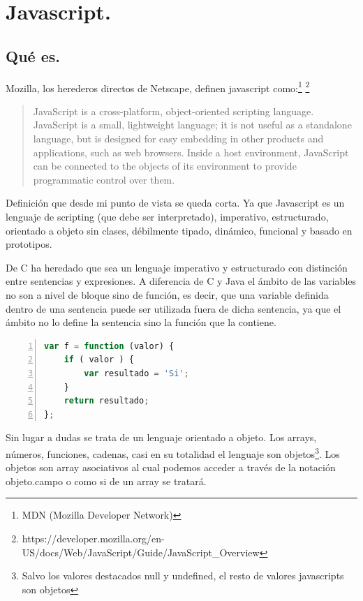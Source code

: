 \section{Javascript.}

\subsection{Qué es.}

Mozilla, los herederos directos de Netscape, definen javascript como:\footnote{MDN (Mozilla Developer Network)} \footnote{https://developer.mozilla.org/en-US/docs/Web/JavaScript/Guide/JavaScript\_Overview}

\begin{quotation}
JavaScript is a cross-platform, object-oriented scripting language. JavaScript is a small, lightweight language; it is not useful as a standalone language, but is designed for easy embedding in other products and applications, such as web browsers. Inside a host environment, JavaScript can be connected to the objects of its environment to provide programmatic control over them.
\end{quotation}

Definición que desde mi punto de vista se queda corta. Ya que Javascript es un lenguaje de scripting (que debe ser interpretado), imperativo, estructurado, orientado a objeto sin clases, débilmente tipado, dinámico, funcional y basado en prototipos.

De C ha heredado que sea un lenguaje imperativo y estructurado con distinción entre sentencias y expresiones. A diferencia de C y Java el ámbito de las variables no son a nivel de bloque sino de función, es decir, que una variable definida dentro de una sentencia puede ser utilizada fuera de dicha sentencia, ya que el ámbito no lo define la sentencia sino la función que la contiene.

\begin{lstlisting}[language=JavaScript, numbers=left]
var f = function (valor) {
	if ( valor ) {
		var resultado = 'Si';
	} 
	return resultado;
};
\end{lstlisting}

Sin lugar a dudas se trata de un lenguaje orientado a objeto. Los arrays, números, funciones, cadenas, casi en su totalidad el lenguaje son objetos\footnote{Salvo los valores destacados null y undefined, el resto de valores javascripts son objetos}. Los objetos son array asociativos al cual podemos acceder a través de la notación objeto.campo o como si de un array se tratará. 

